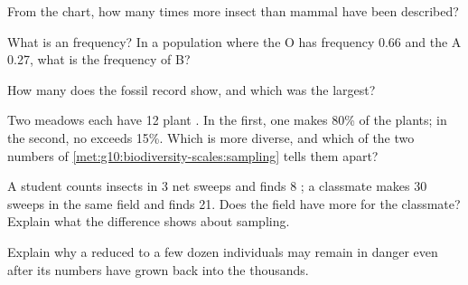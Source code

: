 \begin{exercise}[$\star$]\label{exo:g10:biodiversity-scales:3}
From the  chart, how many times more insect  than
mammal  have been described?
\end{exercise}

\begin{exercise}[$\star$]\label{exo:g10:biodiversity-scales:4}
What is an  frequency? In a population where the O  has
frequency 0.66 and the A  0.27, what is the frequency of B?
\end{exercise}

\begin{exercise}[$\star$]\label{exo:g10:biodiversity-scales:5}
How many  does the fossil record show, and which was
the largest?
\end{exercise}

\begin{exercise}[$\star\star$]\label{exo:g10:biodiversity-scales:6}
Two meadows each have 12 plant . In the first, one 
makes 80\% of the plants; in the second, no  exceeds 15\%.
Which is more diverse, and which of the two numbers of
\cref{met:g10:biodiversity-scales:sampling} tells them apart?
\end{exercise}

\begin{exercise}[$\star\star$]\label{exo:g10:biodiversity-scales:7}
A student counts insects in 3 net sweeps and finds 8 ; a
classmate makes 30 sweeps in the same field and finds 21. Does the
field have more  for the classmate? Explain what the difference
shows about sampling.
\end{exercise}

\begin{exercise}[$\star\star$]\label{exo:g10:biodiversity-scales:8}
Explain why a  reduced to a few dozen individuals may remain
in danger even after its numbers have grown back into the thousands.
\end{exercise}


